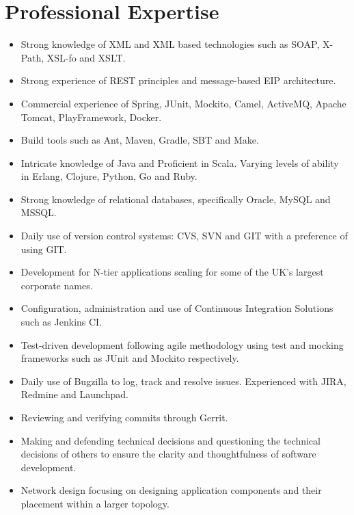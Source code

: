 \documentclass[a4paper,10pt]{moderncv}
\begin{document}
\section{Professional Expertise}
\begin{itemize}
\item Strong knowledge of XML and XML based technologies such as SOAP, X-Path, XSL-fo and XSLT.
\item Strong experience of REST principles and message-based EIP architecture.
\item Commercial experience of Spring, JUnit, Mockito, Camel, ActiveMQ, Apache Tomcat, PlayFramework, Docker.
\item Build tools such as Ant, Maven, Gradle, SBT and Make.
\item Intricate knowledge of Java and Proficient in Scala. Varying levels of ability in Erlang, Clojure, Python, Go and Ruby.
\item Strong knowledge of relational databases, specifically Oracle, MySQL and MSSQL.
\item Daily use of version control systems: CVS, SVN and GIT with a preference of using GIT.
\item Development for N-tier applications scaling for some of the UK's largest corporate names.
\item Configuration, administration and use of Continuous Integration Solutions such as Jenkins CI.
\item Test-driven development following agile methodology using test and mocking frameworks such as JUnit and Mockito respectively.
\item Daily use of Bugzilla to log, track and resolve issues. Experienced with JIRA, Redmine and Launchpad.
\item Reviewing and verifying commits through Gerrit.
\item Making and defending technical decisions and questioning the technical decisions of others to ensure the clarity and thoughtfulness of software development.
\item Network design focusing on designing application components and their placement within a larger topology.
\end{itemize}
\end{document}

